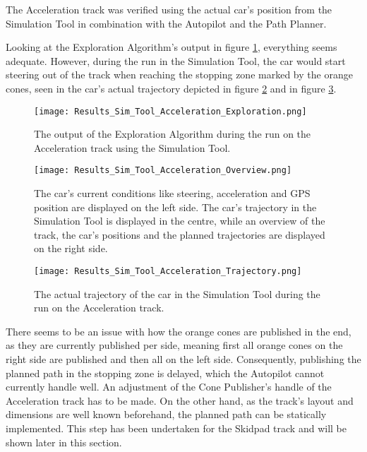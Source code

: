 The Acceleration track was verified using the actual car's position from the Simulation Tool in combination with the Autopilot and the Path Planner.

Looking at the Exploration Algorithm's output in figure \ref{fig:Results Sim Tool Acceleration Exploration}, everything seems adequate. 
However, during the run in the Simulation Tool, the car would start steering out of the track when reaching the stopping zone marked by the orange cones, seen in the car's actual trajectory depicted in figure \ref{fig:Results Sim Tool Acceleration Overview} and in figure \ref{fig:Results Sim Tool Acceleration Trajectory}.
\begin{figure}[H]
    \centering
    \texttt{[image: Results\_Sim\_Tool\_Acceleration\_Exploration.png]}
    \caption{The output of the Exploration Algorithm during the run on the Acceleration track using the Simulation Tool.}
    \label{fig:Results Sim Tool Acceleration Exploration}
\end{figure}
\begin{figure}[H]
    \centering
    \texttt{[image: Results\_Sim\_Tool\_Acceleration\_Overview.png]}
    \caption{The car's current conditions like steering, acceleration and GPS position are displayed on the left side. The car's trajectory in the Simulation Tool is displayed in the centre, while an overview of the track, the car's positions and the planned trajectories are displayed on the right side.}
    \label{fig:Results Sim Tool Acceleration Overview}
\end{figure}
\begin{figure}[H]
    \centering
    \texttt{[image: Results\_Sim\_Tool\_Acceleration\_Trajectory.png]}
    \caption{The actual trajectory of the car in the Simulation Tool during the run on the Acceleration track.}
    \label{fig:Results Sim Tool Acceleration Trajectory}
\end{figure}

There seems to be an issue with how the orange cones are published in the end, as they are currently published per side, meaning first all orange cones on the right side are published and then all on the left side. Consequently, publishing the planned path in the stopping zone is delayed, which the Autopilot cannot currently handle well. An adjustment of the Cone Publisher's handle of the Acceleration track has to be made. On the other hand, as the track's layout and dimensions are well known beforehand, the planned path can be statically implemented. This step has been undertaken for the Skidpad track and will be shown later in this section.

